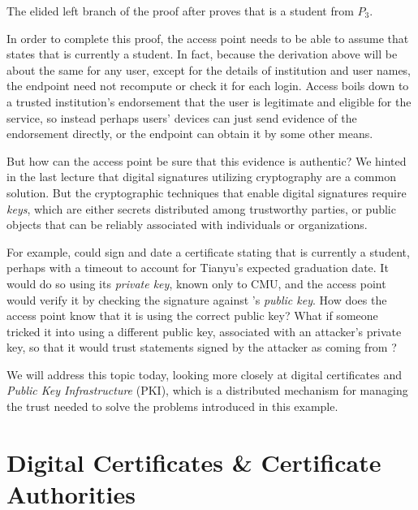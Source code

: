 \documentclass[11pt,twoside]{scrartcl}
\begin{document}
The elided left branch of the proof after  proves that \tli is a student from $P_3$.
\begin{sequentdeduction}
\linfer[alll] {
  \linfer[implyl] {
    \lsequent{}{\says{\cmu}{\isstu(\tli)}}
    &\linfer[id]{\lclose}{\lsequent{\isstu(\tli)}{\isstu(\tli)}}
  } {
    \lsequent{(\says{\cmu}{\isstu(\tli)}) \limply \isstu(\tli)}{\isstu(\tli)}
  }
} {
}
\end{sequentdeduction}
In order to complete this proof, the access point needs to be able to assume that \cmu states that \tli is currently a student. In fact, because the derivation above will be about the same for any user, except for the details of institution and user names, the endpoint need not recompute or check it for each login. Access boils down to a trusted institution's endorsement that the user is legitimate and eligible for the service, so instead perhaps users' devices can just send evidence of the endorsement directly, or the endpoint can obtain it by some other means.

But how can the access point be sure that this evidence is authentic? We hinted in the last lecture that digital signatures utilizing cryptography are a common solution. But the cryptographic techniques that enable digital signatures require \emph{keys}, which are either secrets distributed among trustworthy parties, or public objects that can be reliably associated with individuals or organizations.

For example, \cmu could sign and date a certificate stating that \tli is currently a student, perhaps with a timeout to account for Tianyu's expected graduation date. It would do so using its \emph{private key}, known only to CMU, and the access point would verify it by checking the signature against \cmu's \emph{public key}. How does the access point know that it is using the correct public key? What if someone tricked it into using a different public key, associated with an attacker's private key, so that it would trust statements signed by the attacker as coming from \cmu? 

We will address this topic today, looking more closely at digital certificates and \emph{Public Key Infrastructure} (PKI), which is a distributed mechanism for managing the trust needed to solve the problems introduced in this example.

\section{Digital Certificates \& Certificate Authorities}
\end{document}
